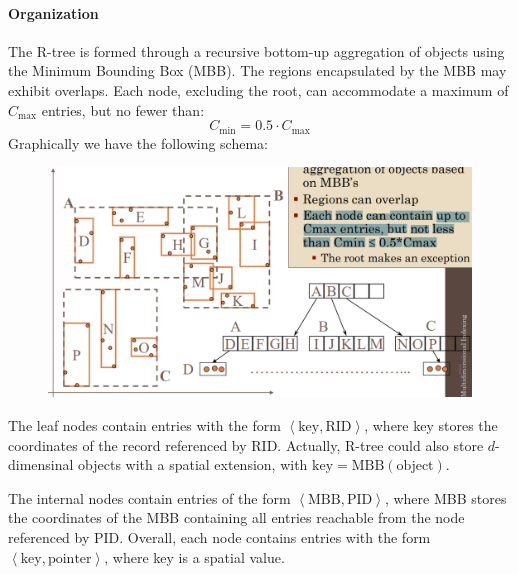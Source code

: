 






















\paragraph*{Organization}
The R-tree is formed through a recursive bottom-up aggregation of objects using the Minimum Bounding Box (MBB). 
The regions encapsulated by the MBB may exhibit overlaps. 
Each node, excluding the root, can accommodate a maximum of $C_{\text{max}}$ entries, but no fewer than:
\[C_{\text{min}}=0.5 \cdot C_{\text{max}}\]
Graphically we have the following schema: 
\begin{figure}[H]
    \centering
    \includegraphics[width=0.5\linewidth]{images/r.png}
\end{figure}

The leaf nodes contain entries with the form $\left\langle \text{key}, \text{RID} \right\rangle$, where key stores the coordinates of the record referenced by RID. 
Actually, R-tree could also store $d$-dimensinal objects with a spatial extension, with $\text{key}=\text{MBB}(\text{object})$. 

The internal nodes contain entries of the form $\left\langle \text{MBB}, \text{PID} \right\rangle$, where MBB stores the coordinates of the MBB containing all entries reachable from the node referenced by PID. 
Overall, each node contains entries with the form $\left\langle \text{key}, \text{pointer} \right\rangle$, where key is a spatial value.

